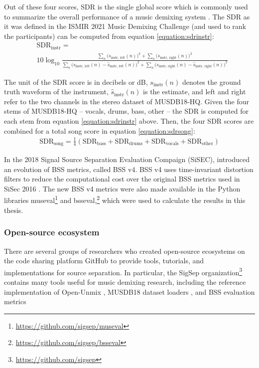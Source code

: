 \documentclass[report.tex]{subfiles}
\begin{document}
Out of these four scores, SDR is the single global score which is commonly used to summarize the overall performance of a music demixing system \parencite{sdruseful}. The SDR as it was defined in the ISMIR 2021 Music Demixing Challenge (and used to rank the participants) can be computed from equation \eqref{equation:sdrinstr}:
\begin{align}
	\nonumber & \text{SDR}_{\text{instr}} = \\
	&10 \log_{10}\frac{\sum_{n}\big(s_{\text{instr, left}}(n)\big)^{2} + \sum_{n}\big(s_{\text{instr, right}}(n)\big)^{2}}{\sum_{n}\big(s_{\text{instr, left}}(n) - \hat{s}_{\text{instr, left}}(n)\big)^{2} + \sum_{n}\big(s_{\text{instr, right}}(n) - \hat{s}_{\text{instr, right}}(n)\big)^{2}} \tag{22}\label{equation:sdrinstr}
\end{align}

The unit of the SDR score is in decibels or dB, $s_{\text{instr}}(n)$ denotes the ground truth waveform of the instrument, $\hat{s}_{\text{instr}}(n)$ is the estimate, and left and right refer to the two channels in the stereo dataset of MUSDB18-HQ. Given the four stems of MUSDB18-HQ -- vocals, drums, bass, other -- the SDR is computed for each stem from equation \eqref{equation:sdrinstr} above. Then, the four SDR scores are combined for a total song score in equation \eqref{equation:sdrsong}:
\begin{align}
	\text{SDR}_{\text{song}} = \frac{1}{4}(\text{SDR}_{\text{bass}} + \text{SDR}_{\text{drums}} + \text{SDR}_{\text{vocals}} + \text{SDR}_{\text{other}}) \tag{23}\label{equation:sdrsong}
\end{align}

In the 2018 Signal Source Separation Evaluation Compaign (SiSEC), \textcite{sisec2018} introduced an evolution of BSS metrics, called BSS v4. BSS v4 uses time-invariant distortion filters to reduce the computational cost over the original BSS metrics used in SiSec 2016 \parencite{sisec2016}. The new BSS v4 metrics were also made available in the Python libraries museval\footnote{\url{https://github.com/sigsep/museval}} and bsseval,\footnote{\url{https://github.com/sigsep/bsseval}} which were used to calculate the results in this thesis.

\subsubsection{Open-source ecosystem}

There are several groups of researchers who created open-source ecosystems on the code sharing platform GitHub to provide tools, tutorials, and implementations for source separation. In particular, the SigSep organization\footnote{\url{https://github.com/sigsep}} contains many tools useful for music demixing research, including the reference implementation of Open-Unmix \parencite{umx}, MUSDB18 dataset loaders \parencite{musdb18, musdb18hq}, and BSS evaluation metrics \parencite{bss, sisec2018}
\end{document}
